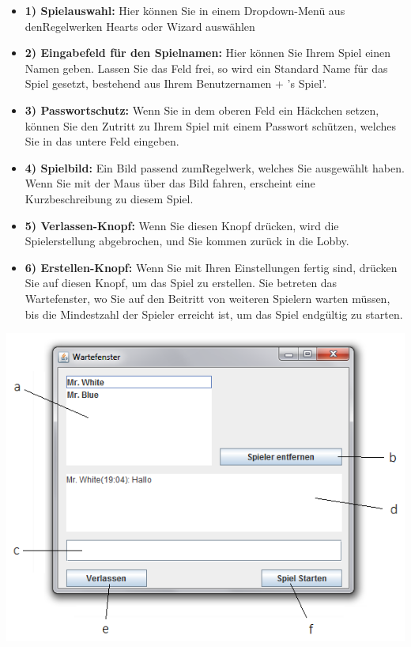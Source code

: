 \documentclass[titlepage,10pt,a4paper]{article}
\begin{document}
\begin{itemize}
	\item \textbf{1) Spielauswahl:} Hier können Sie in einem Dropdown-Menü aus den\gls{Regelwerk}en Hearts oder Wizard auswählen
	\item \textbf{2) Eingabefeld für den Spielnamen:} Hier können Sie Ihrem Spiel einen Namen geben. Lassen Sie das Feld frei, so wird ein Standard Name für das Spiel gesetzt, bestehend aus Ihrem Benutzernamen + 's Spiel'.
	\item \textbf{3) Passwortschutz:} Wenn Sie in dem oberen Feld ein Häckchen setzen, können Sie den Zutritt zu Ihrem Spiel mit einem Passwort schützen, welches Sie in das untere Feld eingeben.
	\item \textbf{4) Spielbild:} Ein Bild passend zum\gls{Regelwerk}, welches Sie ausgewählt haben. Wenn Sie mit der Maus über das Bild fahren, erscheint eine Kurzbeschreibung zu diesem Spiel.
	\item \textbf{5) Verlassen-Knopf:} Wenn Sie diesen Knopf drücken, wird die Spielerstellung abgebrochen, und Sie kommen zurück in die Lobby.
	\item \textbf{6) Erstellen-Knopf:} Wenn Sie mit Ihren Einstellungen fertig sind, drücken Sie auf diesen Knopf, um das Spiel zu erstellen. Sie betreten das \gls{Wartefenster}, wo Sie auf den Beitritt von weiteren Spielern warten müssen, bis die Mindestzahl der Spieler erreicht ist, um das Spiel endgültig zu starten.	
\end{itemize}
\includegraphics[width=\textwidth]{Warte-Fenster}
\end{document}
